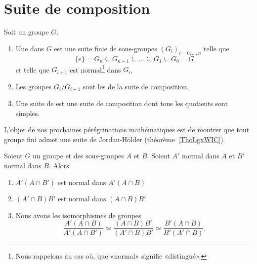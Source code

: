 \section{Suite de composition}


\begin{definition}  \label{DefJWZSooNcntfK}
	Soit un groupe \( G\).
	\begin{enumerate}
		\item
		      Une  dans \( G\) est une suite finie de sous-groupes \( (G_i)_{i=0,\ldots, n}\) telle que
		      \begin{equation}
			      \{ e \}=G_n\subseteq G_{n-1}\subseteq\ldots\subseteq G_1\subseteq G_0=G
		      \end{equation}
		      et telle que \( G_{i+1}\) est normal\footnote{Nous rappelons au cas où, que «normal» signifie «distingué».} dans \( G_i\).
		\item
		      Les groupes \( G_i/G_{i+1}\) sont les  de la suite de composition.
		\item
		      Une suite de  est une suite de composition dont tous les quotients sont simples.
	\end{enumerate}
\end{definition}
L'objet de nos prochaines pérégrinations mathématiques est de montrer que tout groupe fini admet une suite de Jordan-Hölder (théorème~\ref{ThoLgxWIC}).

\begin{lemma}\label{LemsKpXCG}
	Soient \( G\) un groupe et des sous-groupes \( A\) et \( B\). Soient \( A'\) normal dans \( A\) et \( B'\) normal dans \( B\). Alors
	\begin{enumerate}
		\item
		      \( A'(A\cap B')\) est normal dans \( A'(A\cap B)\)
		\item
		      \( (A'\cap B)B'\) est normal dans \( (A\cap B)B'\)
		\item
		      Nous avons les isomorphismes de groupes
		      \begin{equation}
			      \frac{ A'(A\cap B) }{ A'(A\cap B') }\simeq\frac{ (A\cap B)B' }{ (A'\cap B)B' }\simeq\frac{ B'(A\cap B) }{ B'(A'\cap B) }.
		      \end{equation}
	\end{enumerate}
\end{lemma}

